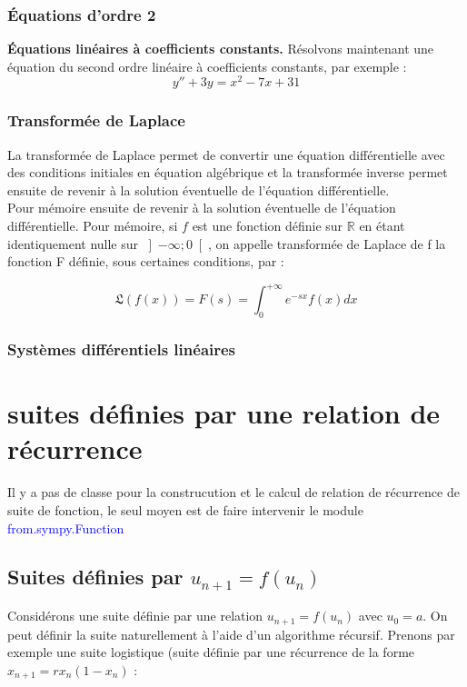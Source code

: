 \subsection{ Équations d’ordre 2}
\textbf{Équations linéaires à coefficients constants.} Résolvons maintenant une équation du second ordre linéaire à coefficients constants, par exemple :
\[
 y''+3y = x^{2}-7x+31
\]
\subsection{ Transformée de Laplace}
La transformée de Laplace permet de convertir une équation différentielle avec
des conditions initiales en équation algébrique et la transformée inverse permet
ensuite de revenir à la solution éventuelle de l’équation différentielle.
\\
Pour mémoire ensuite de revenir à la solution éventuelle de l’équation différentielle.
Pour mémoire, si $f$ est une fonction définie sur $\mathbb{R}$ en étant identiquement nulle
sur $\left]-\infty; 0\right[$, on appelle transformée de Laplace de f la fonction F définie, sous
certaines conditions, par :

\[
 \mathfrak{L}\left(f\left(x\right)\right) = F\left(s\right) = \int_{0}^{+\infty} e^{-sx} f\left(x\right)dx
\]
\subsection{ Systèmes différentiels linéaires}
\chapter{suites définies par une relation de récurrence}
Il y a pas de classe pour la construcution et le calcul de relation de récurrence de suite de fonction, le seul moyen est
de faire intervenir le module \textcolor{blue}{from.sympy.Function}
	\section{Suites définies par $u_{n+1} = f\left(u_{n} \right)$}
 \begin{definition}
 Considérons une suite définie par une relation $u_{n+1} = f\left(u_{n}\right)$ avec $u_{0} = a$. On peut définir la suite naturellement à l’aide d’un algorithme récursif. Prenons par exemple une suite logistique (suite définie par une récurrence
de la forme $x_{n+1} = rx_{n}\left(1 - x_{n} \right)$ :
 \end{definition}
 
